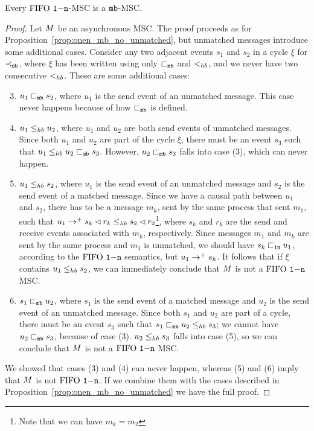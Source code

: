 \begin{proposition} \label{prop:onen_mb_unmatched}
	Every $\text{FIFO } \mathtt{1\mathsf{-}n}$-MSC is a $\mathtt{mb}$-MSC.
\end{proposition}
\begin{proof}
Let $M$ be an asynchronous MSC. The proof proceeds as for Proposition~\ref{prop:onen_mb_no_unmatched}, but unmatched messages introduce some additional cases. Consider any two adjacent events $s_1$ and $s_2$ in a cycle $\xi$ for $\prec_{\mathtt{mb}}$, where $\xi$ has been written using only $\sqsubset_{\mathtt{mb}}$ and $<_{hb}$, and we never have two consecutive $<_{hb}$. These are some additional cases:
\begin{enumerate}\setcounter{enumi}{2}
	\item $u_1 \sqsubset_{\mathtt{mb}} s_2$, where $u_1$ is the send event of an unmatched message. This case never happens because of how $\sqsubset_{\mathtt{mb}}$ is defined.
	\item $u_1 \leq_{hb} u_2$, where $u_1$ and $u_2$ are both send events of unmatched messages. Since both $u_1$ and $u_2$ are part of the cycle $\xi$, there must be an event $s_3$ such that $u_1 \leq_{hb} u_2 \sqsubset_{\mathtt{mb}} s_3$. However, $u_2 \sqsubset_{\mathtt{mb}} s_3$ falls into case (3), which can never happen.
	\item $u_1 \leq_{hb} s_2$, where $u_1$ is the send event of an unmatched message and $s_2$ is the send event of a matched message. Since we have a causal path between $u_1$ and $s_2$, there has to be a message $m_k$, sent by the same process that sent $m_1$, such that $u_1 \to^+ s_k \lhd r_k \leq_{hb} s_2 \lhd r_2$\footnote{Note that we can have $m_k = m_2$}, where $s_k$ and $r_k$ are the send and receive events associated with $m_k$, respectively. Since messages $m_1$ and $m_k$ are sent by the same process and $m_1$ is unmatched, we should have $s_k \sqsubset_{\mathtt{1n}} u_1$, according to the $\text{FIFO } \mathtt{1\mathsf{-}n}$ semantics, but $u_1 \to^+ s_k$. It follows that if $\xi$ contains $u_1 \leq_{hb} s_2$, we can immediately conclude that $M$ is not a $\text{FIFO } \mathtt{1\mathsf{-}n}$ MSC.
	\item $s_1 \sqsubset_{\mathtt{mb}} u_2$,  where $s_1$ is the send event of a matched message and $u_2$ is the send event of an unmatched message. Since both $s_1$ and $u_2$ are part of a cycle, there must be an event $s_3$ such that $s_1 \sqsubset_{\mathtt{mb}} u_2 \leq_{hb} s_3$; we cannot have $u_2 \sqsubset_{\mathtt{mb}} s_3$, because of case (3). $u_2 \leq_{hb} s_3$ falls into case (5), so we can conclude that $M$ is not a $\text{FIFO } \mathtt{1\mathsf{-}n}$ MSC.
\end{enumerate}
We showed that cases (3) and (4) can never happen, whereas  (5) and (6)  imply that $M$ is not $\text{FIFO } \mathtt{1\mathsf{-}n}$. If we combine them with the cases described in Proposition~\ref{prop:onen_mb_no_unmatched} we have the full proof.
\end{proof}

